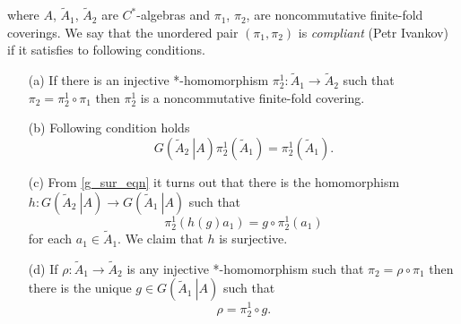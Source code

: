 \documentclass{beamer}
\theoremstyle{plain}
\newcommand{\be}{\begin{equation}}
\newcommand{\ee}{\end{equation}}
\begin{document}
	where $A$, $\widetilde A_1$, $\widetilde A_2$ are $C^*$-algebras and $\pi_1$, $\pi_2$, are noncommutative finite-fold coverings. We say that the unordered pair $\left( \pi_1,\pi_2\right) $ is \textit{compliant} (\alert{Petr Ivankov}) if  it satisfies to following conditions.
	\begin{enumerate}
		\item[(a)]
		If there is an injective *-homomorphism $\pi^1_2: \widetilde A_1 \to \widetilde A_2$ such that $\pi_2 = \pi^1_2 \circ \pi_1$ then $\pi^1_2$ is  a noncommutative finite-fold  covering.
		\item[(b)] Following condition holds
		\be\label{g_sur_eqn}
		G\left(\left.\widetilde A_2~\right|A \right)\pi^1_2\left(\widetilde A_1\right)=  \pi^1_2\left(\widetilde A_1\right).
		\ee 
\pagebreak
\newline
		\item[(c)] From \eqref{g_sur_eqn} it turns out that there is the homomorphism $h: G\left(\left.\widetilde A_2~\right|A \right)\to 	G\left(\left.\widetilde A_1~\right|A \right)$ such that 
		$$
		\pi^1_2\left( h\left(g \right)a_1\right) = g \circ \pi^1_2\left(a_1 \right)
		$$
		for each $a_1 \in \widetilde A_1$.  
		We claim that $h$ is surjective. 
		\item[(d)] If  $\rho: \widetilde A_1 \to \widetilde A_2$ is any injective *-homomorphism  such that $\pi_2 = \rho \circ \pi_1$ then there is the unique $g \in 	G\left(\left.\widetilde A_1~\right|A \right)$ such that 
		\be\label{compliant_covering_g_eqn}
		\rho =  \pi^1_2 \circ g.
		\ee
		\newline
	\end{enumerate}
\end{document}
